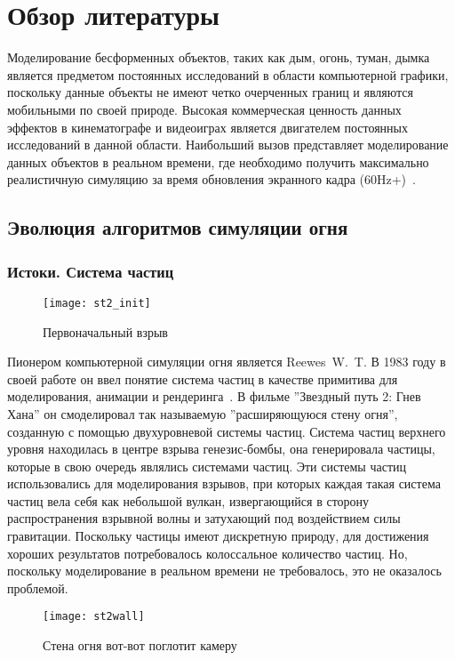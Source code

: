 \section{Обзор литературы}

Моделирование бесформенных объектов, таких как дым, огонь, туман, дымка является
предметом постоянных исследований в области компьютерной графики, поскольку
данные объекты не имеют четко очерченных границ и являются мобильными по своей
природе. Высокая коммерческая ценность данных эффектов в кинематографе и
видеоиграх является двигателем постоянных исследований в данной области.
Наибольший вызов представляет моделирование данных объектов в реальном времени,
где необходимо получить максимально реалистичную симуляцию за время обновления
экранного кадра (60Hz+)~\cite{lec17}.

\subsection{Эволюция алгоритмов симуляции огня}
\subsubsection{Истоки. Система частиц}
\begin{figure}[htb]
	\centering
	\texttt{[image: st2\_init]}
	\caption{Первоначальный взрыв}
\end{figure}
Пионером компьютерной симуляции огня является Reewes~W.~T. В 1983 году в своей
работе он ввел понятие система частиц в качестве примитива для моделирования,
анимации и рендеринга~\cite{reewes1983}. В фильме ''Звездный путь 2: Гнев Хана''
он смоделировал так называемую ''расширяющуюся стену огня'', созданную с помощью
двухуровневой системы частиц. Система частиц верхнего уровня находилась в центре
взрыва генезис-бомбы, она генерировала частицы, которые в свою очередь являлись
системами частиц. Эти системы частиц использовались для моделирования взрывов,
при которых каждая такая система частиц вела себя как небольшой вулкан,
извергающийся в сторону распространения взрывной волны и затухающий под
воздействием силы гравитации. Поскольку частицы имеют дискретную природу, для
достижения хороших результатов потребовалось колоссальное количество частиц. Но,
поскольку моделирование в реальном времени не требовалось, это не оказалось
проблемой.
\begin{figure}[htb]
	\centering
	\texttt{[image: st2wall]}
	\caption{Стена огня вот-вот поглотит камеру}
\end{figure}

